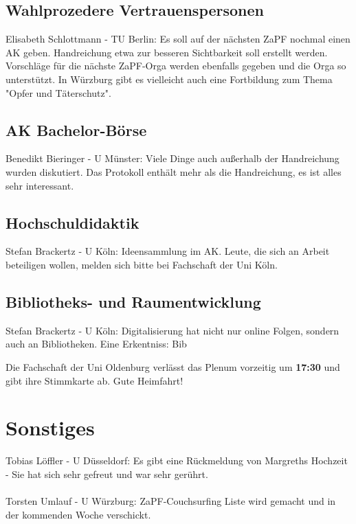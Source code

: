   \subsection{Wahlprozedere Vertrauenspersonen}
    Elisabeth Schlottmann - TU Berlin:  Es soll auf der nächsten ZaPF nochmal einen AK geben.
    Handreichung etwa zur besseren Sichtbarkeit soll erstellt werden.
    Vorschläge für die nächste ZaPF-Orga werden ebenfalls gegeben und die Orga so unterstützt.
    In Würzburg gibt es vielleicht auch eine Fortbildung zum Thema "Opfer und Täterschutz".

  \subsection{AK Bachelor-Börse}
    Benedikt Bieringer - U Münster:  Viele Dinge auch außerhalb der Handreichung wurden diskutiert.
    Das Protokoll enthält mehr als die Handreichung, es ist alles sehr interessant.

  \subsection{Hochschuldidaktik}
    Stefan Brackertz - U Köln:  Ideensammlung im AK. Leute, die sich an Arbeit beteiligen wollen, melden sich bitte bei Fachschaft der Uni Köln.

  \subsection{Bibliotheks- und Raumentwicklung}
    Stefan Brackertz - U Köln:  Digitalisierung hat nicht nur online Folgen, sondern auch an Bibliotheken. Eine Erkentniss: Bib

  \begin{info}{}
    Die Fachschaft der Uni Oldenburg verlässt das Plenum vorzeitig um \textbf{17:30} und gibt ihre Stimmkarte ab. Gute Heimfahrt!
  \end{info}

\section{Sonstiges}
    Tobias Löffler - U Düsseldorf:  Es gibt eine Rückmeldung von Margreths Hochzeit - Sie hat sich sehr gefreut und war sehr gerührt. \\ \\

    Torsten Umlauf - U Würzburg:  ZaPF-Couchsurfing Liste wird gemacht und in der kommenden Woche verschickt.

